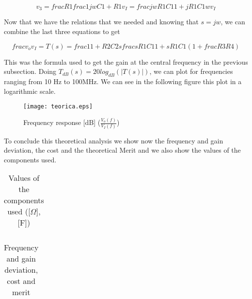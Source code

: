 \begin{equation}
	v_3 = frac{R1}{frac{1}{jwC1 + R1}}v_I = frac{jwR1C1}{1 + jR1C1w}v_I
\end{equation}

\par Now that we have the relations that we needed and knowing that $s=jw$, we can combine the last three equations to get

\begin{equation}
	frac{v_o}{v_I} = T(s) = frac{1}{1 + R2 C2 s} frac{s R1 C1}{1 + s R1 C1} (1 + frac{R3}{R4})
\end{equation}

\par This was the formula used to get the gain at the central frequency in the previous subsection. Doing $T_{dB}(s) = 20log_{dB}(|T(s)|)$, we can plot for frequencies ranging from 10 Hz to 100MHz. We can see in the following figure this plot in a logarithmic scale.

\begin{figure}[H] 
	\centering
	\texttt{[image: teorica.eps]}
	\caption{Frequency response [dB] ($\frac{V_o(f)}{V_I(f)}$)}
\end{figure}

\par To conclude this theoretical analysis we show now the frequency and gain deviation, the cost and the theoretical Merit and we also show the values of the components used.

\vspace{5mm}
\begin{table}[H]
	\centering
	\begin{tabularx}{0.9\textwidth} {
 	    | >{\raggedright\arraybackslash}X
  	    | >{\raggedleft\arraybackslash}X | }
	\hline
	
	\end{tabularx}
	\caption{Values of the components used ([$\Omega$],[F])}
	\label{tab:currents}
\end{table}
\vspace{5mm}

\vspace{5mm}
\begin{table}[H]
	\centering
	\begin{tabularx}{0.9\textwidth} {
 	    | >{\raggedright\arraybackslash}X
  	    | >{\raggedleft\arraybackslash}X | }
	\hline
	
	\end{tabularx}
	\caption{Frequency and gain deviation, cost and merit}
	\label{tab:currents}
\end{table}
\vspace{5mm}
